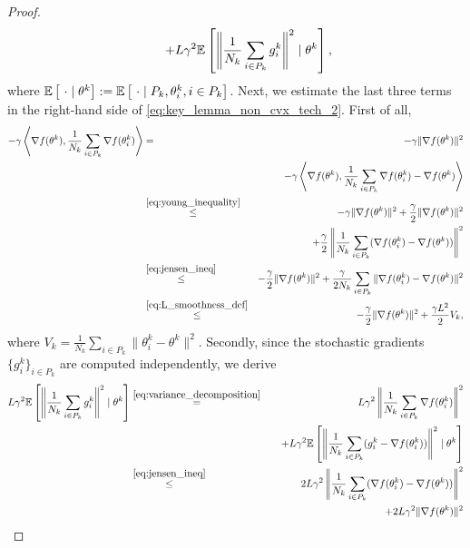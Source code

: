 \begin{proof}
\begin{eqnarray}
        &&\quad + L\gamma^2\mathbb{E}\left[\left\|\frac{1}{N_k}\sum\limits_{i\in P_k}g_i^k\right\|^2\mid \theta^k\right],\label{eq:key_lemma_non_cvx_tech_2}
    \end{eqnarray}
    where $\mathbb{E}\left[\ \cdot \mid \theta^k\right] := \mathbb{E}\left[\ \cdot \mid P_k, \theta_i^k, i\in P_k\right]$. Next, we estimate the last three terms in the right-hand side of \eqref{eq:key_lemma_non_cvx_tech_2}. First of all,
\begin{eqnarray}
    -\gamma\left\langle\nabla f(\theta^k), \frac{1}{N_k}\sum\limits_{i\in P_k}\nabla f(\theta_i^k)\right\rangle &=& -\gamma\|\nabla f(\theta^k)\|^2 \notag\\
    &&\quad - \gamma\left\langle\nabla f(\theta^k), \frac{1}{N_k}\sum\limits_{i\in P_k}\nabla f(\theta_i^k) - \nabla f(\theta^k)\right\rangle \notag\\
    &\overset{\eqref{eq:young_inequality}}{\le}& -\gamma\|\nabla f(\theta^k)\|^2 + \frac{\gamma}{2}\|\nabla f(\theta^k)\|^2\notag\\
    &&\quad+ \frac{\gamma}{2}\left\|\frac{1}{N_k}\sum\limits_{i\in P_k}(\nabla f(\theta_i^k) - \nabla f(\theta^k))\right\|^2\notag\\
    &\overset{\eqref{eq:jensen_ineq}}{\le}& - \frac{\gamma}{2}\|\nabla f(\theta^k)\|^2 + \frac{\gamma}{2N_k}\sum\limits_{i\in P_k}\|\nabla f(\theta_i^k) - \nabla f(\theta^k)\|^2\notag\\
    &\overset{\eqref{eq:L_smoothness_def}}{\le}& - \frac{\gamma}{2}\|\nabla f(\theta^k)\|^2 + \frac{\gamma L^2}{2}V_k, \label{eq:key_lemma_non_cvx_tech_3}
\end{eqnarray}
where $V_k = \frac{1}{N_k}\sum_{i\in P_k}\|\theta_i^k - \theta^k\|^2$. Secondly, since the stochastic gradients $\{g_i^k\}_{i\in P_k}$ are computed independently, we derive
\begin{eqnarray}
    L\gamma^2\EE\left[\left\|\frac{1}{N_k}\sum\limits_{i\in P_k}g_i^k\right\|^2\mid \theta^k\right] &\overset{\eqref{eq:variance_decomposition}}{=}& L\gamma^2\left\|\frac{1}{N_k}\sum\limits_{i\in P_k}\nabla f(\theta_i^k)\right\|^2\notag\\
    &&\quad + L\gamma^2\EE\left[\left\|\frac{1}{N_k}\sum\limits_{i\in P_k}(g_i^k-\nabla f(\theta_i^k))\right\|^2\mid \theta^k\right]\notag\\
    &\overset{\eqref{eq:jensen_ineq}}{\le}& 2L\gamma^2 \left\|\frac{1}{N_k}\sum\limits_{i\in P_k}(\nabla f(\theta_i^k)-\nabla f(\theta^k))\right\|^2 \notag\\
    &&\quad + 2L\gamma^2\|\nabla f(\theta^k)\|^2 \notag\\

\end{eqnarray}
\end{proof}
